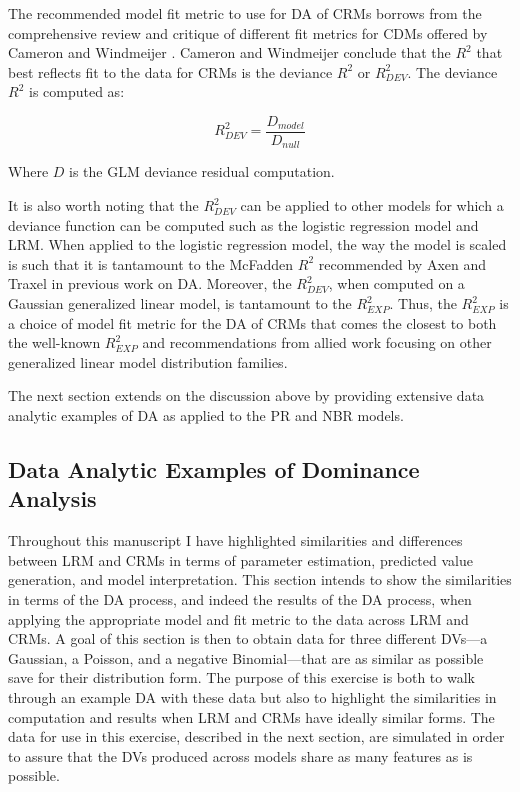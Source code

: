 \documentclass[ShortAfour,times,sageapa]{sagej}
\begin{document}
	The recommended model fit metric to use for DA of CRMs borrows from the comprehensive review and critique of different fit metrics for CDMs offered by Cameron and Windmeijer \cite{cameron1996r}.
	Cameron and Windmeijer conclude that the $R^2$ that best reflects fit to the data for CRMs is the deviance $R^2$ or $R^{2}_{DEV}$.
	The deviance $R^2$ is computed as:
	
	$$R^{2}_{DEV} = \frac{D_{model}}{D_{null}}$$
	
	Where $D$ is the GLM deviance residual computation.
	
	It is also worth noting that the $R^2_{DEV}$ can be applied to other models for which a deviance function can be computed such as the logistic regression model and LRM.  
	When applied to the logistic regression model, the way the model is scaled is such that it is tantamount to the McFadden $R^2$ recommended by Axen and Traxel \cite{azen2009using} in previous work on DA.
	Moreover, the $R^2_{DEV}$, when computed on a Gaussian generalized linear model, is tantamount to the $R^2_{EXP}$.
	Thus, the $R^2_{EXP}$ is a choice of model fit metric for the DA of CRMs that comes the closest to both the well-known $R^2_{EXP}$ and recommendations from allied work focusing on other generalized linear model distribution families.
	
	The next section extends on the discussion above by providing extensive data analytic examples of DA as applied to the PR and NBR models. 
	
	\subsection{Data Analytic Examples of Dominance Analysis}
	
	Throughout this manuscript I have highlighted similarities and differences between LRM and CRMs in terms of parameter estimation, predicted value generation, and model interpretation.
	This section intends to show the similarities in terms of the DA process, and indeed the results of the DA process, when applying the appropriate model and fit metric to the data across LRM and CRMs.
	A goal of this section is then to obtain data for three different DVs---a Gaussian, a Poisson, and a negative Binomial---that are as similar as possible save for their distribution form.
	The purpose of this exercise is both to walk through an example DA with these data but also to highlight the similarities in computation and results when LRM and CRMs have ideally similar forms.
	The data for use in this exercise, described in the next section, are simulated in order to assure that the DVs produced across models share as many features as is possible.
	
\end{document}
